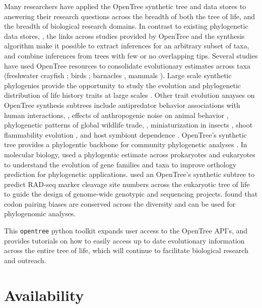\documentclass[oupdraft]{sysbio_sse}
\begin{document}
Many researchers have applied the OpenTree synthetic tree and data stores to answering their research questions across the breadth of both the tree of life, and the breadth of biological research domains.
In contrast to existing phylogenetic data stores, \citep{piel2000treebase}, the links across studies provided by OpenTree and the synthesis algorithm make it possible to extract inferences for an arbitrary subset of taxa, and combine inferences from trees with few or no overlapping tips.
Several studies have used OpenTree resources to consolidate evolutionary estimates across taxa (freshwater crayfish \citep{owen2015synthetic}; birds \citep{brown2017development}; barnacles \citep{ewers2019towards, ewers2019testing}, mammals \citep{uyeda2017evolution}).
Large scale synthetic phylogenies provide the opportunity to study the evolution and phylogenetic distribution of life history traits at large scales  \citep{tarka2018sex, healy2019animal, capdevila2020longevity}.
Other trait evolution anayses on OpenTree synthesis subtrees include antipredator behavior associations with human interactions, \citep{geffroy2020evolutionary}, effects of anthropogenic noise on
animal behavior  \citep{kunc2019effects}, phylogenetic patterns of global wildlife trade,  \citep{fukushima2020global},  miniaturization in insects \citep{polilov2017scaling},
shoot flammability evolution \citep{cui2020shoot}, and host symbiont dependence \citep{fisher2017evolution}. 
OpenTree's synthetic tree provides a phylogentic backbone for community phylogenetic analyses \citep{li2019common, jantzen2019effects}.
In molecular biology, \citet{boeckmann2015quest} used a phylogentic estimate across prokaryotes and eukaryotes to understand the evolution
of gene families and taxa to improve orthology prediction for phylogenetic applications.
\citet{herrera2015predicting} used an OpenTree's synthetic subtree to predict RAD-seq marker cleavage site numbers
across the eukaryotic tree of life to guide the design of genome-wide genotypic and
sequencing projects.
\citet{miller2020codonpairs} found that codon pairing biases are conserved across the diversity and can  be used for phylogenomic analyses.


This \texttt{opentree} python toolkit expands user access to the OpenTree API's, and provides tutorials on how to easily access up to date evolutionary information across the entire tree of life, which will continue to facilitate biological research and outreach.


\section{Availability}
\label{sec6}
\end{document}

